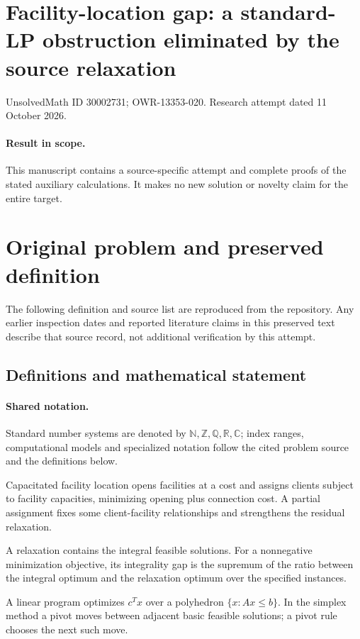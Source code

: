 \documentclass[11pt]{article}
\begin{document}
\section*{Facility-location gap: a standard-LP obstruction eliminated by the source relaxation}
\noindent UnsolvedMath ID 30002731; OWR-13353-020. Research attempt dated 11 October 2026.
\paragraph{Result in scope.}This manuscript contains a source-specific attempt and complete proofs of the stated auxiliary calculations. It makes no new solution or novelty claim for the entire target.
\section{Original problem and preserved definition}
The following definition and source list are reproduced from the repository. Any earlier inspection dates and reported literature claims in this preserved text describe that source record, not additional verification by this attempt.
\subsection{Definitions and mathematical statement}

\paragraph{Shared notation.}Standard number systems are denoted by $\mathbb N,\mathbb Z,\mathbb Q,\mathbb R,\mathbb C$; index ranges, computational models and specialized notation follow the cited problem source and the definitions below.


Capacitated facility location opens facilities at a cost and assigns clients subject to facility capacities, minimizing opening plus connection cost. A partial assignment fixes some client-facility relationships and strengthens the residual relaxation.

A relaxation contains the integral feasible solutions. For a nonnegative minimization objective, its integrality gap is the supremum of the ratio between the integral optimum and the relaxation optimum over the specified instances.

A linear program optimizes $c^Tx$ over a polyhedron $\{x:Ax\leq b\}$. In the simplex method a pivot moves between adjacent basic feasible solutions; a pivot rule chooses the next such move.
\end{document}
